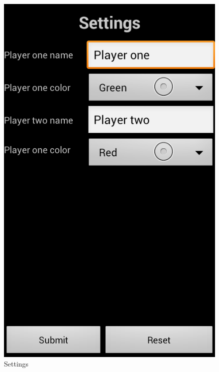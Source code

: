 \begin{figure}[ht]
\begin{minipage}[b]{0.325\linewidth}
		\includegraphics[scale=0.225]{img/Screenshot_settings.png}
		\caption{Settings}
		\label{fig:settings}
	\end{minipage}
	\begin{minipage}[b]{0.325\linewidth}
		\centering

\end{minipage}
\end{figure}
